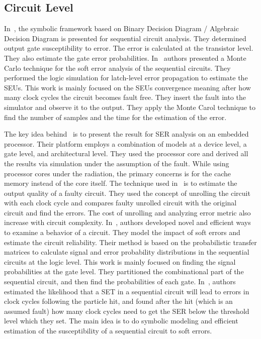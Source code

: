 \subsection{Circuit Level}

In~\citep{miskov2007mars}, the symbolic framework based on Binary Decision Diagram / Algebraic Decision
Diagram is presented for sequential circuit analysis. They determined output gate susceptibility to error. The error is calculated at the transistor level. They also estimate the gate error probabilities.
In~\citep{li2016monte} authors presented a  Monte Carlo technique for the soft error analysis of the sequential
circuits. They performed the logic simulation for latch-level error propagation to estimate the SEUs. This work is mainly focused on the SEUs convergence meaning after how many clock cycles the circuit becomes fault free.
They insert the fault into the simulator and observe it to the output. They apply the Monte Carol technique
to find the number of samples and the time for the estimation of the error.
  
  
The key idea behind~\citep{ebrahimi2015comprehensive} is to present the result for SER analysis on an embedded
processor. Their platform employs a combination of models at a device level, a gate level, and architectural level. They used the
processor core and derived all the results via simulation under the assumption of the fault. While using processor cores under the radiation, the primary concerns is for the cache memory instead
of the core itself.
The technique used in~\citep{ranjan2014aslan} is to estimate the output quality of a faulty circuit. They used the concept
of unrolling the circuit with each clock cycle and compares faulty unrolled circuit with the original circuit and find the errors.
The cost of unrolling and analyzing error metric also increase
with circuit complexity.
In~\citep{yu2010scalable}, authors developed novel and efficient ways to examine a behavior of a circuit. They model the impact of soft errors and estimate the circuit reliability. Their method is based on the probabilistic transfer matrices to calculate signal and error probability distributions in the
sequential circuits at the logic level. This work is mainly focused on finding the signal probabilities at the gate level. They partitioned the combinational part of the sequential circuit, and then find the probabilities of each gate.
In~\citep{miskov2007mars},  authors estimated the likelihood that a SET in a sequential circuit will lead to errors
in clock cycles following the particle hit, and found after the hit (which is an assumed fault) how many clock
cycles need to get the SER below the threshold level which they set. The main idea is to do symbolic modeling and efficient estimation of the susceptibility of a sequential circuit to soft errors.

